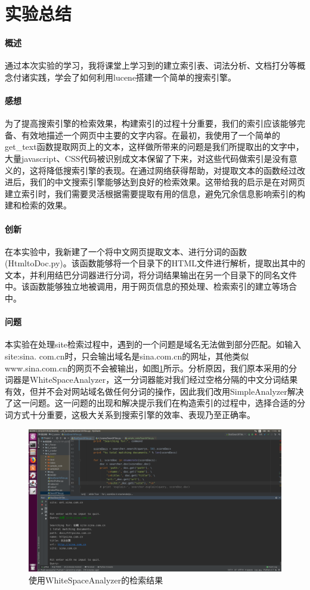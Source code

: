 \documentclass{article}
\begin{document}
\section{实验总结}
\paragraph{概述}
通过本次实验的学习，我将课堂上学习到的建立索引表、词法分析、文档打分等概念付诸实践，学会了如何利用lucene搭建一个简单的搜索引擎。

\paragraph{感想}
为了提高搜索引擎的检索效果，构建索引的过程十分重要，我们的索引应该能够完备、有效地描述一个网页中主要的文字内容。在最初，我使用了一个简单的get\_text函数提取网页上的文本，这样做所带来的问题是我们所提取出的文字中，大量javascript、CSS代码被识别成文本保留了下来，对这些代码做索引是没有意义的，这将降低搜索引擎的表现。在通过网络获得帮助，对提取文本的函数经过改进后，我们的中文搜索引擎能够达到良好的检索效果。这带给我的启示是在对网页建立索引时，我们需要灵活根据需要提取有用的信息，避免冗余信息影响索引的构建和检索的效果。

\paragraph{创新}
在本实验中，我新建了一个将中文网页提取文本、进行分词的函数(HtmltoDoc.py)。该函数能够将一个目录下的HTML文件进行解析，提取出其中的文本，并利用结巴分词器进行分词，将分词结果输出在另一个目录下的同名文件中。该函数能够独立地被调用，用于网页信息的预处理、检索索引的建立等场合中。


\paragraph{问题}
本实验在处理site检索过程中，遇到的一个问题是域名无法做到部分匹配。如输入site:sina. com.cn时，只会输出域名是sina.com.cn的网址，其他类似www.sina.com.cn的网页不会被输出，如图\ref{fig:sitetest2}所示。分析原因，我们原本采用的分词器是WhiteSpaceAnalyzer，这一分词器能对我们经过空格分隔的中文分词结果有效，但并不会对网站域名做任何分词的操作，因此我们改用SimpleAnalyzer解决了这一问题。这一问题的出现和解决提示我们在构造索引的过程中，选择合适的分词方式十分重要，这极大关系到搜索引擎的效率、表现乃至正确率。

\begin{figure}[htbp]
\centering
\includegraphics[width=14.5cm]{img/sitesearch.png}
\caption{使用WhiteSpaceAnalyzer的检索结果}
\label{fig:sitetest2}
\end{figure}
\end{document}
